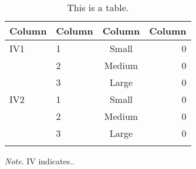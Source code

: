 \begin{table}[htpb]
  \begin{center}
    \caption{This is a table.}
    \label{tab:table1}
    \footnotesize
    \begin{tabular}{llcr}
      \textbf{Column} & \textbf{Column} & \textbf{Column} & \textbf{Column}\\      
      \hline
      \addlinespace[1ex]
      IV1
      & 1 & Small  & 0 \\
      & 2 & Medium & 0 \\
      & 3 & Large  & 0  \\
      IV2
      & 1 & Small  & 0 \\
      & 2 & Medium & 0 \\
      & 3 & Large  & 0 \\
      \addlinespace[1ex]
      \hline
    \end{tabular}
    
    \bigskip
    \footnotesize\textit{Note}. IV indicates..
  \end{center}
\end{table}
